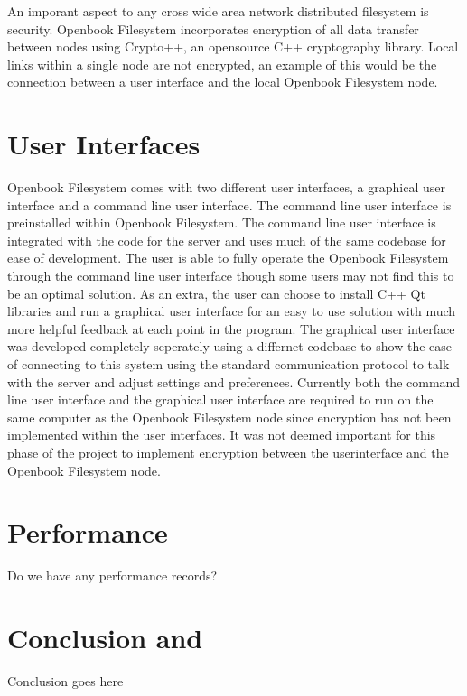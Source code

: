 \documentclass[letterpaper]{article}
\begin{document}
An imporant aspect to any cross wide area network distributed filesystem is security. Openbook Filesystem incorporates encryption of all data transfer between nodes using Crypto++, an opensource C++ cryptography library. Local links within a single node are not encrypted, an example of this would be the connection between a user interface and the local Openbook Filesystem node.

\section{User Interfaces}
Openbook Filesystem comes with two different user interfaces, a graphical user interface and a command line user interface. The command line user interface is preinstalled within Openbook Filesystem. The command line user interface is integrated with the code for the server and uses much of the same codebase for ease of development. The user is able to fully operate the Openbook Filesystem through the command line user interface though some users may not find this to be an optimal solution. As an extra, the user can choose to install C++ Qt libraries and run a graphical user interface for an easy to use solution with much more helpful feedback at each point in the program. The graphical user interface was developed completely seperately using a differnet codebase to show the ease of connecting to this system using the standard communication protocol to talk with the server and adjust settings and preferences. Currently both the command line user interface and the graphical user interface are required to run on the same computer as the Openbook Filesystem node since encryption has not been implemented within the user interfaces. It was not deemed important for this phase of the project to implement encryption between the userinterface and the Openbook Filesystem node.

\section{Performance}
Do we have any performance records?

\section{Conclusion and }
Conclusion goes here
\end{document}
